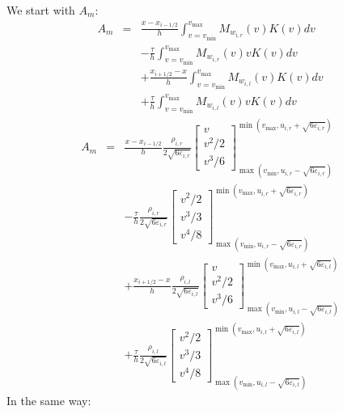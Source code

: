 \documentclass{fldauth}
\theoremstyle{plain}
\theoremstyle{plain}
\theoremstyle{plain}
\theoremstyle{plain}
\theoremstyle{plain}
\theoremstyle{plain}
\begin{document}
We start with \( A_{m}: \)
\begin{eqnarray*}
A_{m} & = & \frac{x-x_{i-1/2}}{h}\int _{v=v_{\min }}^{v_{\max }}M_{w_{i,r}}(v)K(v)dv\\
 &  & -\frac{\tau }{h}\int _{v=v_{\min }}^{v_{\max }}M_{w_{i,r}}(v)vK(v)dv\\
 &  & +\frac{x_{i+1/2}-x}{h}\int _{v=v_{\min }}^{v_{\max }}M_{w_{i,l}}(v)K(v)dv\\
 &  & +\frac{\tau }{h}\int _{v=v_{\min }}^{v_{\max }}M_{w_{i,l}}(v)vK(v)dv
\end{eqnarray*}
\begin{eqnarray*}
A_{m} & = & \frac{x-x_{i-1/2}}{h}\frac{\rho _{i,r}}{2\sqrt{6\varepsilon _{i,r}}}\left[ \begin{array}{c}
v\\
v^{2}/2\\
v^{3}/6
\end{array}\right] _{\max (v_{\min },u_{i,r}-\sqrt{6\varepsilon _{i,r}})}^{\min (v_{\max },u_{i,r}+\sqrt{6\varepsilon _{i,r}})}\\
 &  & -\frac{\tau }{h}\frac{\rho _{i,r}}{2\sqrt{6\varepsilon _{i,r}}}\left[ \begin{array}{c}
v^{2}/2\\
v^{3}/3\\
v^{4}/8
\end{array}\right] _{\max (v_{\min },u_{i,r}-\sqrt{6\varepsilon _{i,r}})}^{\min (v_{\max },u_{i,r}+\sqrt{6\varepsilon _{i,r}})}\\
 &  & +\frac{x_{i+1/2}-x}{h}\frac{\rho _{i,l}}{2\sqrt{6\varepsilon _{i,l}}}\left[ \begin{array}{c}
v\\
v^{2}/2\\
v^{3}/6
\end{array}\right] _{\max (v_{\min },u_{i,l}-\sqrt{6\varepsilon _{i,l}})}^{\min (v_{\max },u_{i,l}+\sqrt{6\varepsilon _{i,l}})}\\
 &  & +\frac{\tau }{h}\frac{\rho _{i,l}}{2\sqrt{6\varepsilon _{i,l}}}\left[ \begin{array}{c}
v^{2}/2\\
v^{3}/3\\
v^{4}/8
\end{array}\right] _{\max (v_{\min },u_{i,l}-\sqrt{6\varepsilon _{i,l}})}^{\min (v_{\max },u_{i,l}+\sqrt{6\varepsilon _{i,l}})}
\end{eqnarray*}
 In the same way:
\end{document}
